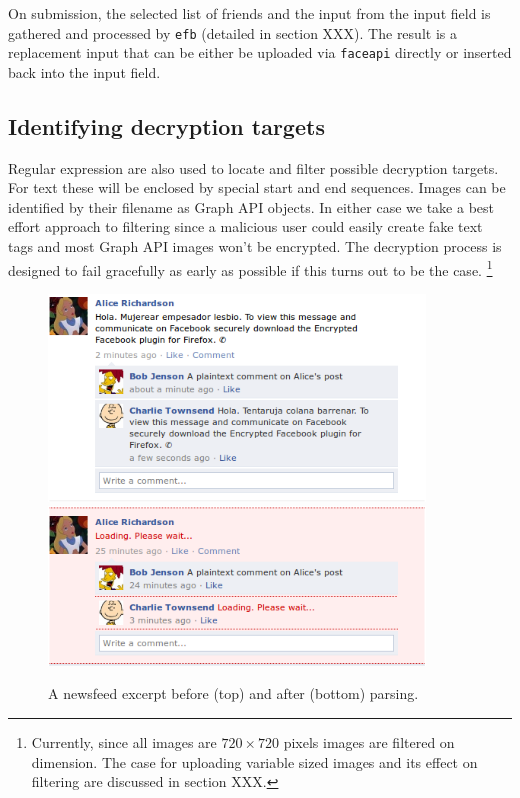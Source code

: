 On submission, the selected list of friends and the input from the input field is gathered and processed by {\tt efb} (detailed in section XXX). The result is a replacement input that can be either be uploaded via {\tt faceapi} directly or inserted back into the input field.

\subsection{Identifying decryption targets}
\label{ssec:ident-targets}

Regular expression are also used to locate and filter possible decryption targets. For text these will be enclosed by special start and end sequences. Images can be identified by their filename as Graph API objects. In either case we take a best effort approach to filtering since a malicious user could easily create fake text tags and most Graph API images won't be encrypted. The decryption process is designed to fail gracefully as early as possible if this turns out to be the case. \footnote{Currently, since all images are $720 \times 720$ pixels images are filtered on dimension. The case for uploading variable sized images and its effect on filtering are discussed in section XXX.}

    \begin{figure}[tbph]
        \begin{center}
                \includegraphics[width=10cm]{screens/content1.png}
                \includegraphics[width=10cm]{screens/content4.png}
            \caption{A newsfeed excerpt before (top) and after (bottom) parsing.}
            \label{scn:ctrl}
        \end{center}
    \end{figure}
    
